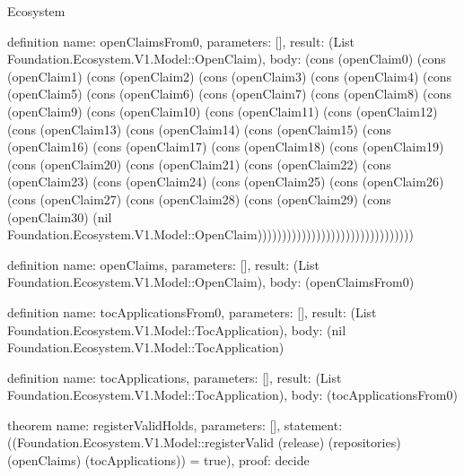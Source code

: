 \begin{lexlean}{Ecosystem}
\begin{semanticmodule}
definition{
  name: openClaimsFrom0,
  parameters: [],
  result: (List Foundation.Ecosystem.V1.Model::OpenClaim),
  body: (cons (openClaim0) (cons (openClaim1) (cons (openClaim2) (cons (openClaim3) (cons (openClaim4) (cons (openClaim5) (cons (openClaim6) (cons (openClaim7) (cons (openClaim8) (cons (openClaim9) (cons (openClaim10) (cons (openClaim11) (cons (openClaim12) (cons (openClaim13) (cons (openClaim14) (cons (openClaim15) (cons (openClaim16) (cons (openClaim17) (cons (openClaim18) (cons (openClaim19) (cons (openClaim20) (cons (openClaim21) (cons (openClaim22) (cons (openClaim23) (cons (openClaim24) (cons (openClaim25) (cons (openClaim26) (cons (openClaim27) (cons (openClaim28) (cons (openClaim29) (cons (openClaim30) (nil Foundation.Ecosystem.V1.Model::OpenClaim))))))))))))))))))))))))))))))))
}

definition{
  name: openClaims,
  parameters: [],
  result: (List Foundation.Ecosystem.V1.Model::OpenClaim),
  body: (openClaimsFrom0)
}

definition{
  name: tocApplicationsFrom0,
  parameters: [],
  result: (List Foundation.Ecosystem.V1.Model::TocApplication),
  body: (nil Foundation.Ecosystem.V1.Model::TocApplication)
}

definition{
  name: tocApplications,
  parameters: [],
  result: (List Foundation.Ecosystem.V1.Model::TocApplication),
  body: (tocApplicationsFrom0)
}

theorem{
  name: registerValidHolds,
  parameters: [],
  statement: ((Foundation.Ecosystem.V1.Model::registerValid (release) (repositories) (openClaims) (tocApplications)) = true),
  proof: decide{}
}
\end{semanticmodule}
\end{lexlean}
